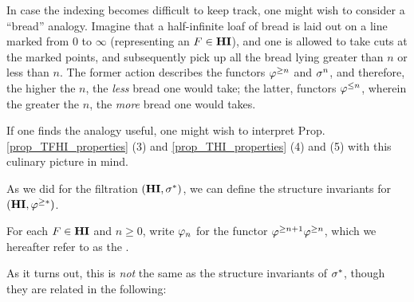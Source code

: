 \begin{rmk}
In case the indexing becomes difficult to keep track, one might
wish to consider a ``bread'' analogy. Imagine that a half-infinite 
loaf of bread is laid out on a line marked from 0 to $\infty$ 
(representing an $F \in \mathbf{HI}$), and one is allowed to take cuts at 
the marked points, and subsequently pick up all the bread lying 
greater than $n$ or less than $n$. The former action describes the 
functors $\varphi^{\geq n}$ and $\sigma^{n}$, and therefore, the higher the 
$n$, the \emph{less} bread one would take; the latter, functors 
$\varphi^{\leq n}$, wherein the greater the $n$, the \emph{more} bread one 
would takes.

If one finds the analogy useful, one might wish to interpret
Prop. \ref{prop_TFHI_properties} (3) and \ref{prop_THI_properties} (4)
and (5) with this culinary picture in mind.
\end{rmk}

As we did for the filtration $(\mathbf{HI}, \sigma^{*})$, we can define the 
structure invariants for $(\mathbf{HI}, \varphi^{\geq *})$. 
\begin{defn}
For each $F \in \mathbf{HI}$ and $n \geq 0$, write $\varphi_{n}$ for the functor 
$\varphi^{\geq n + 1} \varphi^{\geq n}$, which we hereafter refer to as the 
. 
\end{defn}

As it turns out, this is \emph{not} the same as the structure 
invariants of $\sigma^{*}$, though they are related in the following:

